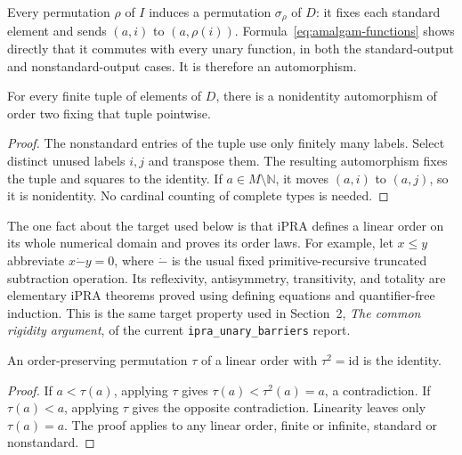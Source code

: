 Every permutation $\rho$ of $I$ induces a permutation $\sigma_\rho$
of $D$: it fixes each standard element and sends $(a,i)$ to
$(a,\rho(i))$. Formula~\eqref{eq:amalgam-functions} shows directly
that it commutes with every unary function, in both the standard-output
and nonstandard-output cases. It is therefore an automorphism.

\begin{lemma}
\label{lem:amalgam-involution}
For every finite tuple of elements of $D$, there is a nonidentity
automorphism of order two fixing that tuple pointwise.
\end{lemma}
\begin{proof}
The nonstandard entries of the tuple use only finitely many labels.
Select distinct unused labels $i,j$ and transpose them. The resulting
automorphism fixes the tuple and squares to the identity. If
$a\in M\setminus\mathbb N$, it moves $(a,i)$ to $(a,j)$, so
it is nonidentity. No cardinal counting of complete types is needed.
\end{proof}

The one fact about the target used below is that iPRA defines a linear
order on its whole numerical domain and proves its order laws. For
example, let $x\le y$ abbreviate $x\mathbin{\dot-}y=0$,
where $\mathbin{\dot-}$ is the usual fixed primitive-recursive truncated
subtraction operation. Its reflexivity, antisymmetry, transitivity,
and totality are elementary iPRA theorems proved using defining
equations and quantifier-free induction. This is the same target
property used in Section~2, \emph{The common rigidity argument}, of the
current \texttt{ipra\_unary\_barriers} report.

\begin{lemma}
\label{lem:amalgam-order}
An order-preserving permutation $\tau$ of a linear order with
$\tau^2=\mathrm{id}$ is the identity.
\end{lemma}
\begin{proof}
If $a<\tau(a)$, applying $\tau$ gives
$\tau(a)<\tau^2(a)=a$, a contradiction. If $\tau(a)<a$,
applying $\tau$ gives the opposite contradiction. Linearity leaves
only $\tau(a)=a$. The proof applies to any linear order, finite
or infinite, standard or nonstandard.
\end{proof}

